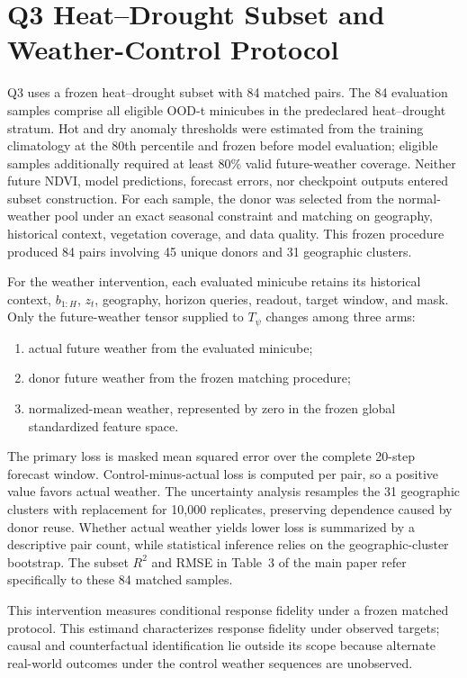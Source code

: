 \documentclass[letterpaper]{article}
\begin{document}
\section{Q3 Heat--Drought Subset and Weather-Control Protocol}
\label{sec:q3-results}

Q3 uses a frozen heat--drought subset with 84 matched pairs. The 84 evaluation
samples comprise all eligible OOD-t minicubes in the predeclared
heat--drought stratum. Hot and dry anomaly thresholds were estimated from the
training climatology at the 80th percentile and frozen before model
evaluation; eligible samples additionally required at least 80\% valid
future-weather coverage. Neither future NDVI, model predictions, forecast
errors, nor checkpoint outputs entered subset construction. For each sample,
the donor was selected from the normal-weather pool under an exact seasonal
constraint and matching on geography, historical context, vegetation
coverage, and data quality. This frozen procedure produced 84 pairs involving
45 unique donors and 31 geographic clusters.

For the weather intervention, each evaluated minicube retains its historical
context, \(b_{1:H}\), \(z_t\), geography, horizon queries, readout, target
window, and mask. Only the future-weather tensor supplied to \(T_\psi\)
changes among three arms:
\begin{enumerate}
    \item actual future weather from the evaluated minicube;
    \item donor future weather from the frozen matching procedure;
    \item normalized-mean weather, represented by zero in the frozen
    global standardized feature space.
\end{enumerate}

The primary loss is masked mean squared error over the complete 20-step
forecast window. Control-minus-actual loss is computed per pair, so a positive
value favors actual weather. The uncertainty analysis resamples the 31
geographic clusters with replacement for 10,000 replicates, preserving
dependence caused by donor reuse. Whether actual weather yields lower loss is
summarized by a descriptive pair count, while statistical inference relies on
the geographic-cluster bootstrap. The subset \(R^2\) and RMSE in Table~3 of
the main paper refer specifically to these 84 matched samples.

This intervention measures conditional response fidelity under a frozen
matched protocol. This estimand characterizes response fidelity under observed
targets; causal and counterfactual identification lie outside its scope
because alternate real-world outcomes under the control weather sequences are
unobserved.
\end{document}
